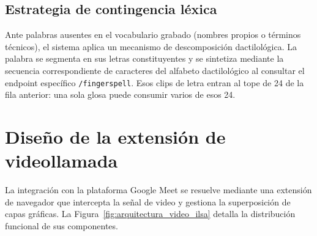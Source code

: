 \subsection{Estrategia de contingencia léxica}
Ante palabras ausentes en el vocabulario grabado (nombres propios o términos técnicos), el sistema aplica un mecanismo de descomposición dactilológica. La palabra se segmenta en sus letras constituyentes y se sintetiza mediante la secuencia correspondiente de caracteres del alfabeto dactilológico al consultar el endpoint específico \texttt{/fingerspell}. Esos clips de letra entran al tope de 24 de la fila anterior: una sola glosa puede consumir varios de esos 24.

\section{Diseño de la extensión de videollamada}
\label{sec:diseno_extension}

La integración con la plataforma Google Meet se resuelve mediante una extensión de navegador que intercepta la señal de video y gestiona la superposición de capas gráficas. La Figura~\ref{fig:arquitectura_video_ilsa} detalla la distribución funcional de sus componentes.

